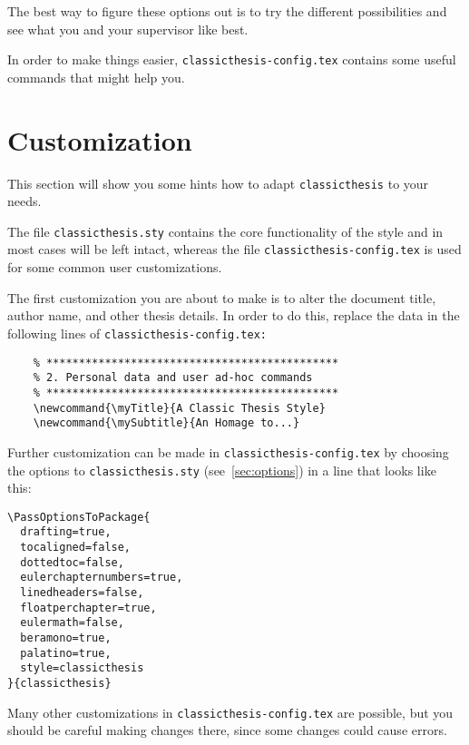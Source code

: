 The best way to figure these options out is to try the different
possibilities and see what you and your supervisor like best.

In order to make things easier, \texttt{classicthesis-config.tex}
contains some useful commands that might help you.


\section{Customization}\label{sec:custom}
This section will show you some hints how to adapt
\texttt{classicthesis} to your needs.

The file \texttt{classicthesis.sty}
contains the core functionality of the style and in most cases will
be left intact, whereas the file \texttt{classic\-thesis-config.tex}
is used for some common user customizations.

The first customization you are about to make is to alter the document
title, author name, and other thesis details. In order to do this, replace
the data in the following lines of \texttt{classicthesis-config.tex:}%

\begin{lstlisting}
    % *********************************************
    % 2. Personal data and user ad-hoc commands
    % *********************************************
    \newcommand{\myTitle}{A Classic Thesis Style}
    \newcommand{\mySubtitle}{An Homage to...}
\end{lstlisting}

Further customization can be made in \texttt{classicthesis-config.tex}
by choosing the options to \texttt{classicthesis.sty}
(see~\autoref{sec:options}) in a line that looks like this:

\begin{lstlisting}
\PassOptionsToPackage{
  drafting=true,    
  tocaligned=false, 
  dottedtoc=false,  
  eulerchapternumbers=true, 
  linedheaders=false,
  floatperchapter=true,
  eulermath=false,
  beramono=true,
  palatino=true,
  style=classicthesis
}{classicthesis}
\end{lstlisting}

Many other customizations in \texttt{classicthesis-config.tex} are
possible, but you should be careful making changes there, since some
changes could cause errors.



